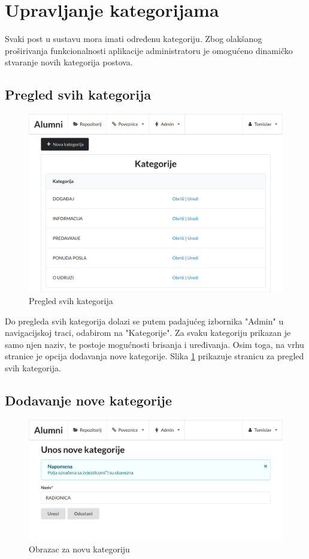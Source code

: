 \documentclass[zavrsni, numeric]{fer}
\begin{document}
\section{Upravljanje kategorijama}
Svaki post u sustavu mora imati određenu kategoriju. Zbog olakšanog proširivanja funkcionalnosti aplikacije administratoru je omogućeno dinamičko stvaranje novih kategorija postova. 

\subsection{Pregled svih kategorija}

\begin{figure}[H]
	\centering
	\includegraphics[width=13cm]{slike/kategorije.png}
	\caption{Pregled svih kategorija}
	\label{fig:kategorije}
\end{figure}

Do pregleda svih kategorija dolazi se putem padajućeg izbornika "Admin" u navigacijskoj traci, odabirom na "Kategorije". Za svaku kategoriju prikazan je samo njen naziv, te postoje mogućnosti brisanja i uređivanja. Osim toga, na vrhu stranice je opcija dodavanja nove kategorije. Slika \ref{fig:kategorije} prikazuje stranicu za pregled svih kategorija.

\subsection{Dodavanje nove kategorije}

\begin{figure}[H]
	\centering
	\includegraphics[width=13cm]{slike/nova-kategorija.png}
	\caption{Obrazac za novu kategoriju}
	\label{fig:nova-kategorija}
\end{figure}
\end{document}
